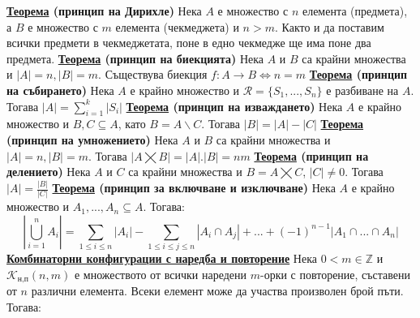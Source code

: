 \documentclass{article}
\begin{document}
\textbf{\underline{Теорема} (принцип на Дирихле)} \newline
Нека $A$ е множество с $n$ елемента (предмета), а $B$ е множество с $m$ елемента (чекмеджета) и $n > m$. Както и да поставим
всички предмети в чекмеджетата, поне в едно чекмедже ще има поне два предмета. \newline\newline
\textbf{\underline{Теорема} (принцип на биекцията)} \newline
Нека $A$ и $B$ са крайни множества и $|A| = n, |B| = m$. Съществува биекция $f : A \rightarrow B \iff n = m$ \newline\newline
\textbf{\underline{Теорема} (принцип на събирането)} \newline
Нека $A$ е крайно множество и $\mathcal{R} = \{S_1, ..., S_n\}$ е разбиване на $A$. Тогава $|A| = \sum_{i = 1}^{k}|S_i|$ \newline\newline
\textbf{\underline{Теорема} (принцип на изваждането)} \newline
Нека $A$ е крайно множество и $B,C \subseteq A$, като $B = A \backslash C$. Тогава $|B| = |A| - |C|$ \newline\newline
\textbf{\underline{Теорема} (принцип на умножението)} \newline
Нека $A$ и $B$ са крайни множества и $|A| = n, |B| = m$. Тогава $|A \bigtimes B| = |A| . |B| = nm$ \newline\newline
\textbf{\underline{Теорема} (принцип на делението)} \newline
Нека $A$ и $C$ са крайни множества и $B = A \bigtimes C$, $|C| \neq 0$. Тогава $|A| = \frac{|B|}{|C|}$ \newline\newline
\textbf{\underline{Теорема} (принцип за включване и изключване)} \newline
Нека $A$ е крайно множество и $A_1, ..., A_n \subseteq A$. Тогава:
$$|\bigcup^n_{i=1} A_i| = \sum_{1 \leq i \leq n}|A_i| - \sum_{1 \leq i \leq j \leq n}|A_i \cap A_j| + ... + (-1)^{n-1}|A_1 \cap ... \cap A_n|$$
\textbf{\underline{Комбинаторни конфигурации с наредба и повторение}} \newline\newline
Нека $0 < m \in \mathbb{Z}$ и $\mathcal{K}_{\text{н,п}}(n, m)$ е множеството от всички наредени $m$-орки с повторение, съставени
от $n$ различни елемента. Всеки елемент може да участва произволен брой пъти. Тогава:
\end{document}
